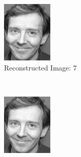 \documentclass[12pt]{article}
\begin{document}
\begin{figure}
\begin{subfigure}[b]{0.20\textwidth}
		\includegraphics[width=\textwidth]{Task4.3_Images/ReconstructedImage7.jpg}
		\caption{Reconstructed Image: 7}
	\end{subfigure}\\
	\begin{subfigure}[b]{0.20\textwidth}
		\includegraphics[width=\textwidth]{Task4.3_Images/ReconstructedImage8.jpg}

\end{subfigure}
\end{figure}
\end{document}
